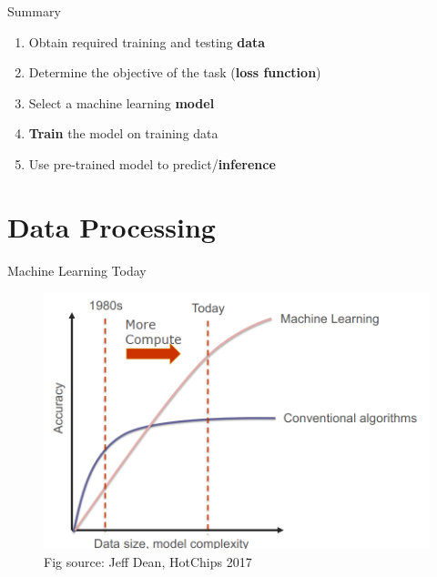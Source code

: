 \documentclass{../TexTemplate/myslide}
\begin{document}
\begin{frame}{Summary}
\begin{enumerate}
	\item Obtain required training and testing \textbf{data}
	\item Determine the objective of the task (\textbf{loss function})
	\item Select a machine learning \textbf{model}
	\item \textbf{Train} the model on training data
	\item Use pre-trained model to predict/\textbf{inference}
\end{enumerate}
\end{frame}

\section{Data Processing}
\begin{frame}
\sectionpage
\end{frame}

\begin{frame}{Machine Learning Today}
\begin{figure}
\centering
\includegraphics[width=0.8\linewidth]{fig/ml_today.png}
\caption*{\scriptsize Fig source: Jeff Dean, HotChips 2017}
\end{figure}
\end{frame}
\end{document}
